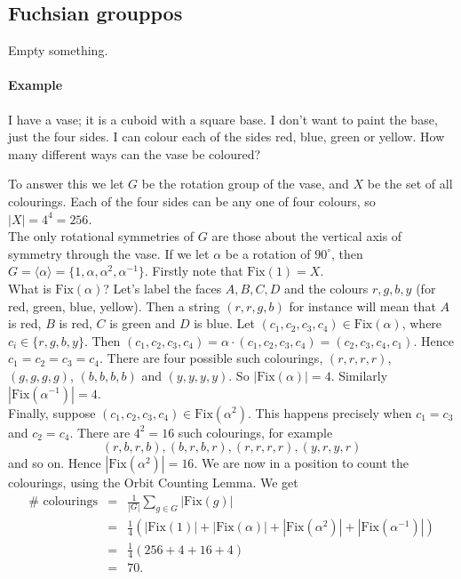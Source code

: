 \documentclass[a4paper,12pt]{report}
\theoremstyle{plain}
\theoremstyle{definition}
\begin{document}
\subsection{Fuchsian grouppos}
Empty something.

\paragraph{Example} I have a vase; it is a cuboid with a square base. I don't want
to paint the base, just the four sides. I can colour each of the
sides red, blue, green or yellow. How many different ways can the
vase be coloured?

To answer this we let $G$ be the rotation group of the vase, and
$X$ be the set of all colourings. Each of the four sides can be
any one of four colours, so $|X| = 4^4 = 256$.\smallskip\\
%
The only rotational symmetries of $G$ are those about the vertical
axis of symmetry through the vase. If we let $\alpha$ be a rotation
of $90^{\circ}$, then $G = \langle \alpha \rangle = \{1, \alpha,
\alpha^2, \alpha^{-1}\}$. Firstly note that $\mathrm{Fix}(1) =
X$.\smallskip\\
%
 What is $\mathrm{Fix}(\alpha)$? Let's label the faces $A,
B, C, D$ and the colours $r, g, b, y$ (for red, green, blue,
yellow). Then a string $(r, r, g, b)$ for instance will mean that
$A$ is red, $B$ is red, $C$ is green and $D$ is blue. Let $(c_1,
c_2, c_3, c_4) \in \mathrm{Fix}(\alpha)$, where $c_i \in \{r, g, b,
y\}$. Then $(c_1, c_2, c_3, c_4) = \alpha\cdot (c_1, c_2, c_3, c_4)
= (c_2, c_3, c_4, c_1)$. Hence $c_1 = c_2 = c_3 = c_4$. There are
four possible such colourings, $(r, r, r, r)$, $(g, g, g, g)$, $(b,
b, b, b)$ and $(y, y, y, y)$. So $|\mathrm{Fix}(\alpha)| = 4$.
Similarly $|\mathrm{Fix}(\alpha^{-1})| = 4$. \smallskip \\
%
Finally, suppose $(c_1, c_2, c_3, c_4) \in \mathrm{Fix}(\alpha^2)$.
This happens precisely when $c_1 = c_3$ and $c_2 = c_4$. There are
$4^2 = 16$ such colourings, for example $$(r, b, r, b), (b, r, b,
r), (r, r, r, r), (y, r, y, r)$$ and so on. Hence
$|\mathrm{Fix}(\alpha^2)| = 16$. We are now in a position to count
the colourings, using the Orbit Counting Lemma. We get
\begin{eqnarray*} \# {\mbox{ colourings}} &=& \frac{1}{|G|}\sum_{g
\in G} |\mathrm{Fix}(g)|\\
&=& \textstyle\frac{1}{4}\left(|\mathrm{Fix}(1)| +
|\mathrm{Fix}(\alpha)| + |\mathrm{Fix}(\alpha^2)|
+ |\mathrm{Fix}(\alpha^{-1})|\right)\\
&=& \textstyle\frac{1}{4}(256 + 4 + 16 + 4)\\
&=& 70.\end{eqnarray*}
\end{document}
